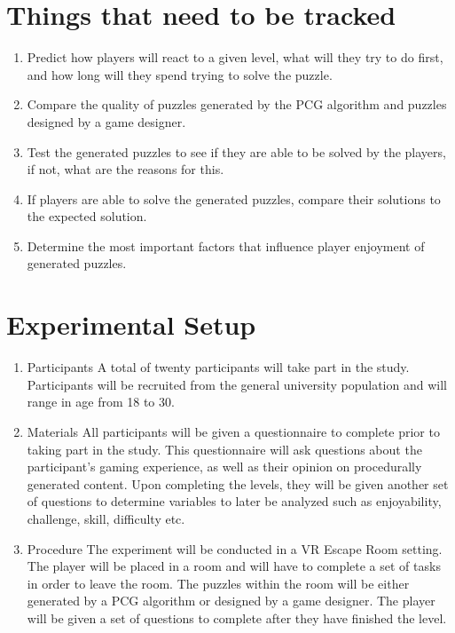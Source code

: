 \documentclass[lettersize,journal]{IEEEtran}
\begin{document}
\section{Things that need to be tracked}

	\begin{enumerate}

    \item Predict how players will react to a given level, what will they try to do first, and how long will they spend trying to solve the puzzle.

    \item Compare the quality of puzzles generated by the PCG algorithm and puzzles designed by a game designer.

    \item Test the generated puzzles to see if they are able to be solved by the players, if not, what are the reasons for this.

    \item If players are able to solve the generated puzzles, compare their solutions to the expected solution.

    \item Determine the most important factors that influence player enjoyment of generated puzzles.
	\end{enumerate}


\section {Experimental Setup}
\begin{enumerate}
\item Participants
A total of twenty participants will take part in the study. Participants will be recruited from the general university population and will range in age from 18 to 30.

\item Materials
All participants will be given a questionnaire to complete prior to taking part in the study. This questionnaire will ask questions about the participant’s gaming experience, as well as their opinion on procedurally generated content. Upon completing the levels, they will be given another set of questions to determine variables to later be analyzed such as enjoyability, challenge, skill, difficulty etc.

\item Procedure
The experiment will be conducted in a VR Escape Room setting. The player will be placed in a room and will have to complete a set of tasks in order to leave the room. The puzzles within the room will be either generated by a PCG algorithm or designed by a game designer. The player will be given a set of questions to complete after they have finished the level.
	\end{enumerate}
\end{document}
